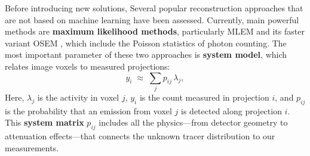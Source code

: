 \documentclass[12pt]{iopart}
\begin{document}
Before introducing new solutions, Several popular reconstruction approaches that are not based on machine learning have been assessed.
Currently, main powerful methods are \textbf{maximum likelihood methods}, particularly MLEM and its faster variant OSEM \cite{363108}, which include the Poisson statistics of photon counting. The most important parameter of these two approaches is \textbf{system model}, which relates image voxels to measured projections:
\begin{equation}
    y_i \;\approx\; \sum_{j} p_{ij}\,\lambda_j,
\end{equation}
Here, $\lambda_j$ is the activity in voxel $j$, $y_i$ is the count measured in projection $i$, and $p_{ij}$ is the probability that an emission from voxel $j$ is detected along projection $i$. This \textbf{system matrix} $p_{ij}$ includes all the physics—from detector geometry to attenuation effects—that connects the unknown tracer distribution to our measurements.
\end{document}
